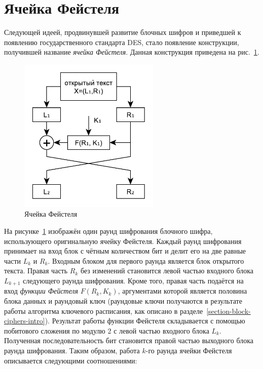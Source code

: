 \section{Ячейка Фейстеля}

Следующей идеей, продвинувшей развитие блочных шифров и приведшей к появлению государственного стандарта DES, стало появление конструкции, получившей название \emph{ячейка Фейстеля}. Данная конструкция приведена на рис.~\ref{fig:Feistel}.

\begin{figure}[!htb]
    \centering
    \includegraphics[width=0.6\textwidth]{pic/feistel}
    \caption{Ячейка Фейстеля\label{fig:Feistel}}
\end{figure}

На рисунке~\ref{fig:Feistel} изображён один раунд шифрования блочного шифра, использующего оригинальную ячейку Фейстеля. Каждый раунд шифрования принимает на вход блок с чётным количеством бит и делит его на две равные части $L_k$ и $R_k$. Входным блоком для первого раунда является блок открытого текста. Правая часть $R_k$ без изменений становится левой частью входного блока $L_{k+1}$ следующего раунда шифрования. Кроме того, правая часть подаётся на вход \emph{функции Фейстеля} $F\left(R_k, K_k \right)$, аргументами которой является половина блока данных и раундовый ключ (раундовые ключи получаются в результате работы алгоритма ключевого расписания, как описано в разделе~\ref{section-block-ciphers-intro}). Результат работы функции Фейстеля складывается с помощью побитового сложения по модулю 2 с левой частью входного блока $L_k$. Полученная последовательность бит становится правой частью выходного блока раунда шифрования. Таким образом, работа $k$-го раунда ячейки Фейстеля описывается следующими соотношениями:

